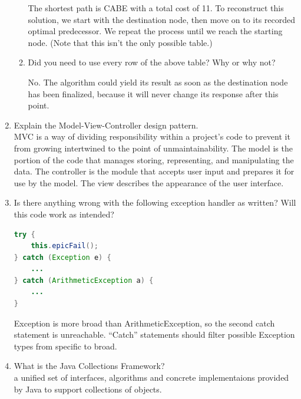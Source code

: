 \documentclass[11pt]{article}
\newenvironment{answer}{\large\lstset{basicstyle=\tiny\ttfamily}\color{white} }{}
\newenvironment{answer}{\large\lstset{basicstyle=\large\ttfamily}\color{red} }{}
\begin{document}
\begin{enumerate}
\begin{enumerate}
\begin{answer}
The shortest path is CABE with a total cost of 11.
To reconstruct this solution, we start with the destination node, then move on to its recorded optimal predecessor.
We repeat the process until we reach the starting node.
(Note that this isn't the only possible table.)
\end{answer}

\item
Did you need to use every row of the above table? Why or why not?

\begin{answer}
No. The algorithm could yield its result as soon as the destination node has been finalized, because it will never change its response after this point.
\end{answer}
\end{enumerate}

\newpage
\item Explain the Model-View-Controller design pattern. \\
\begin{answer}
MVC is a way of dividing responsibility within a project's code to prevent it from growing intertwined to the point of unmaintainability.
The model is the portion of the code that manages storing, representing, and manipulating the data.
The controller is the module that accepts user input and prepares it for use by the model.
The view describes the appearance of the user interface.
\end{answer}

\item Is there anything wrong with the following exception handler as written? Will this
code work as intended? 
\begin{lstlisting}[language=java]
try {
	this.epicFail();
} catch (Exception e) {
	...
} catch (ArithmeticException a) {
	...
}
\end{lstlisting}
\begin{answer}
Exception is more broad than ArithmeticException, so the second catch statement is unreachable.  ``Catch'' statements should filter possible Exception types from specific to broad.
\end{answer}



\item What is the Java Collections Framework? \\
\begin{answer}
    a unified set of interfaces, algorithms and concrete implementaions 
provided by Java to support collections of objects.
\end{answer}






\end{enumerate}
\end{document}
